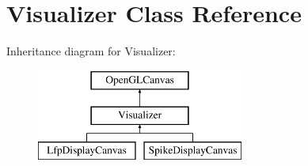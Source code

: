 \hypertarget{classVisualizer}{\section{Visualizer Class Reference}
\label{classVisualizer}
}
Inheritance diagram for Visualizer\-:\begin{figure}[H]
\begin{center}
\leavevmode
\includegraphics[height=3.000000cm]{classVisualizer}
\end{center}
\end{figure}
